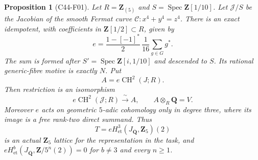 \documentclass[11pt]{article}
\newtheorem{proposition}[theorem]{Proposition}
\theoremstyle{remark}\newtheorem{remark}[theorem]{Remark}
\begin{document}
\begin{proposition}[C44-F01]\label{C44-F01}
Let $R=\mathbf Z_{(5)}$ and $S=\operatorname{Spec}\mathbf Z[1/10]$.
Let $\mathcal J/S$ be the Jacobian of the smooth Fermat curve
$\mathcal C:x^4+y^4=z^4$.  There is an exact idempotent, with
coefficients in $\mathbf Z[1/2]\subset R$, given by
\[
 e=\frac{1-[-1]^*}{2}\,\frac1{16}\sum_{g\in G}g^*.
 \tag{F01.1}
\]
The sum is formed after $S'=\operatorname{Spec}\mathbf Z[i,1/10]$
and descended to $S$.  Its rational generic-fibre motive is exactly
$N$.  Put
\[
 A=e\operatorname{CH}^2(J;R).
\]
Then restriction is an isomorphism
\[
 e\operatorname{CH}^2(\mathcal J;R)
       \xrightarrow{\ \sim\ } A,
 \qquad A\otimes_R\mathbf Q=V.                 \tag{F01.2}
\]
Moreover $e$ acts on geometric $5$-adic cohomology only in degree
three, where its image is a free rank-two direct summand.  Thus
\[
 T=eH^3_{\mathrm{et}}(J_{\overline{\mathbf Q}},\mathbf Z_5)(2)
 \tag{F01.3}
\]
is an actual $\mathbf Z_5$ lattice for the representation in the task,
and $eH^b_{\mathrm{et}}(J_{\overline{\mathbf Q}},\mathbf Z/5^n(2))=0$
for $b\ne3$ and every $n\ge1$.
\end{proposition}
\end{document}
